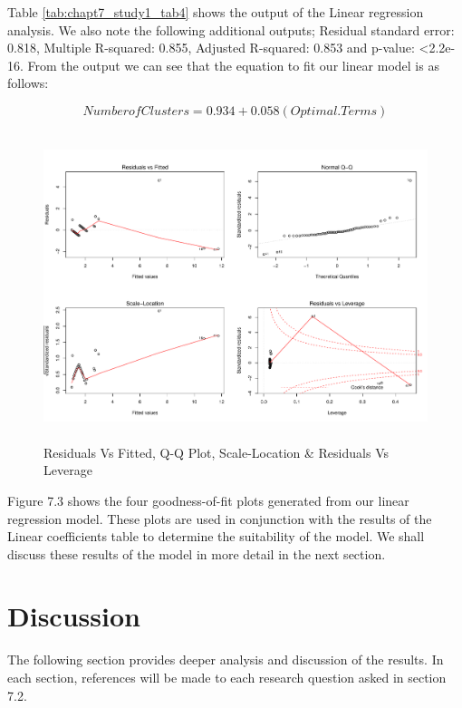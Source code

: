Table \ref{tab:chapt7_study1_tab4} shows the output of the Linear regression analysis. We also note the following additional outputs;  Residual standard error: 0.818, Multiple R-squared:  0.855,	Adjusted R-squared:  0.853 and p-value: \textless 2.2e-16. From the output we can see that the equation to fit our linear model is as follows:

\begin{equation}
Number of Clusters = 0.934 + 0.058(Optimal.Terms)
\end{equation}

\begin{figure}[]
\begin{center}
\includegraphics[height=9cm, width=14cm]{graphs/bundles/linear_fit1.pdf} 
\caption{Residuals Vs Fitted, Q-Q Plot, Scale-Location \& Residuals Vs Leverage}
\end{center}
\label{fig:chapt7_study1_fig3}
\end{figure}

Figure 7.3 shows the four goodness-of-fit plots generated from our linear regression model. These plots are used in conjunction with the results of the Linear coefficients table to determine the suitability of the model. We shall discuss these results of the model in more detail in the next section.

\section{Discussion}

The following section provides deeper analysis and discussion of the results. In each section, references will be made to each research question asked in section 7.2.

